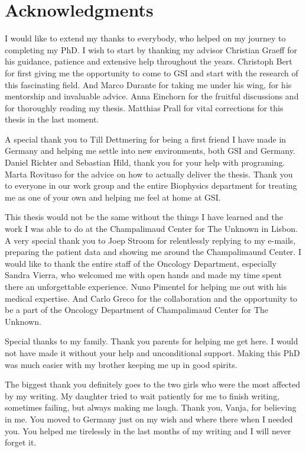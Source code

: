 

\chapter*{Acknowledgments}

I would like to extend my thanks to everybody, who helped on my journey to completing my PhD.
I wish to start by thanking my advisor Christian Graeff for his guidance, patience and extensive help throughout the years. 
Christoph Bert for first giving me the opportunity to come to GSI and start with the research of this fascinating field. And Marco Durante for taking me under his wing, for his mentorship and invaluable advice.  
Anna Einchorn for the fruitful discussions and for thoroughly reading my thesis. Matthias Prall for vital corrections for this thesis in the last moment.

A special thank you to Till Dettmering for being a first friend I have made in Germany and helping me settle into new environments, both GSI and Germany. Daniel Richter and Sebastian Hild, thank you for your help with programing.
Marta Rovituso for the advice on how to actually deliver the thesis. 
Thank you to everyone in our work group and the entire Biophysics department for treating me as one of your own and helping me feel at home at GSI. 

This thesis would not be the same without the things I have learned and the work I was able to do at the Champalimaud Center for The Unknown in Lisbon.
A very special thank you to Joep Stroom for relentlessly replying to my e-mails, preparing the patient data and showing me around the Champalimaund Center.
I would like to thank the entire staff of the Oncology Department, especially Sandra Vierra, who welcomed me with open hands and made my time spent there an unforgettable experience. 
Nuno Pimentel for helping me out with his medical expertise. And Carlo Greco for the collaboration and the opportunity to be a part of the Oncology Department of Champalimaud Center for The Unknown.

Special thanks to my family. Thank you parents for helping me get here. I would not have made it without your help and unconditional support. Making this PhD was much easier with my brother keeping me up in good spirits.

The biggest thank you definitely goes to the two girls who were the most affected by my writing. My daughter tried to wait patiently for me to finish writing, sometimes failing, but always making me laugh.
Thank you, Vanja, for believing in me. You moved to Germany just on my wish and where there when I needed you. You helped me tirelessly in the last months of my writing and I will never forget it. 


